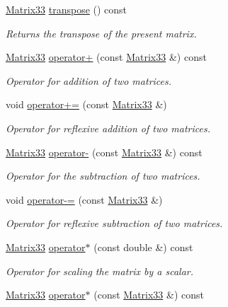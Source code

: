 \begin{DoxyCompactItemize}
\hyperlink{classMatrix33}{Matrix33} \hyperlink{classMatrix33_a64418c1a8836b38526fdfd7ffcc79cfd}{transpose} () const 
\begin{DoxyCompactList}\small\item\em Returns the transpose of the present matrix. \end{DoxyCompactList}\item 
\hyperlink{classMatrix33}{Matrix33} \hyperlink{classMatrix33_adc58ec5739c9250ff1150c725d0e868e}{operator+} (const \hyperlink{classMatrix33}{Matrix33} \&) const 
\begin{DoxyCompactList}\small\item\em Operator for addition of two matrices. \end{DoxyCompactList}\item 
void \hyperlink{classMatrix33_acb59e59d3937e075521f478ba83b7165}{operator+=} (const \hyperlink{classMatrix33}{Matrix33} \&)
\begin{DoxyCompactList}\small\item\em Operator for reflexive addition of two matrices. \end{DoxyCompactList}\item 
\hyperlink{classMatrix33}{Matrix33} \hyperlink{classMatrix33_a372f71ec208bb6d3045acd4324b7cb06}{operator-\/} (const \hyperlink{classMatrix33}{Matrix33} \&) const 
\begin{DoxyCompactList}\small\item\em Operator for the subtraction of two matrices. \end{DoxyCompactList}\item 
void \hyperlink{classMatrix33_abc889e10a9c7c532195c7031c1344a74}{operator-\/=} (const \hyperlink{classMatrix33}{Matrix33} \&)
\begin{DoxyCompactList}\small\item\em Operator for reflexive subtraction of two matrices. \end{DoxyCompactList}\item 
\hyperlink{classMatrix33}{Matrix33} \hyperlink{classMatrix33_a6992fd2bb0b6e9ad71b5d3481c4e3e1a}{operator$\ast$} (const double \&) const 
\begin{DoxyCompactList}\small\item\em Operator for scaling the matrix by a scalar. \end{DoxyCompactList}\item 
\hyperlink{classMatrix33}{Matrix33} \hyperlink{classMatrix33_a525f14614255ff81c0cbab8060e8e065}{operator$\ast$} (const \hyperlink{classMatrix33}{Matrix33} \&) const 

\end{DoxyCompactItemize}
